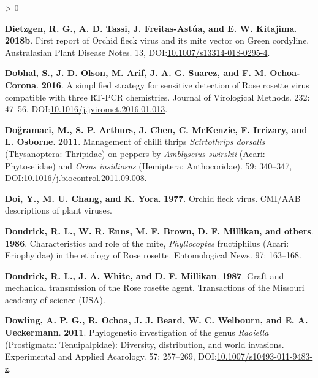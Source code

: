 \documentclass{ufdissertation}[overrideChapters] %
\newlength{\cslhangindent}
\newenvironment{CSLReferences}[2] %
 {%
  \setlength{\parindent}{0pt}
  \ifodd #1 \everypar{\setlength{\hangindent}{\cslhangindent}}\ignorespaces\fi
  \ifnum #2 > 0
  \setlength{\parskip}{#2\baselineskip}
  \fi
 }%
 {}
\begin{document}
{\begin{CSLReferences}{1}{1}
\leavevmode{}%
\textbf{Dietzgen, R. G., A. D. Tassi, J. Freitas-Astúa, and E. W. Kitajima}. \textbf{2018b}. First report of {Orchid fleck virus} and its mite vector on {Green cordyline}. Australasian Plant Disease Notes. 13, DOI:\href{https://doi.org/10.1007/s13314-018-0295-4}{10.1007/s13314-018-0295-4}.

\leavevmode{}%
\textbf{Dobhal, S., J. D. Olson, M. Arif, J. A. G. Suarez, and F. M. Ochoa-Corona}. \textbf{2016}. A simplified strategy for sensitive detection of {Rose rosette virus} compatible with three {RT}-{PCR} chemistries. Journal of Virological Methods. 232: 47--56, DOI:\href{https://doi.org/10.1016/j.jviromet.2016.01.013}{10.1016/j.jviromet.2016.01.013}.

\leavevmode{}%
\textbf{Doğramaci, M., S. P. Arthurs, J. Chen, C. McKenzie, F. Irrizary, and L. Osborne}. \textbf{2011}. Management of chilli thrips {\emph{Scirtothrips dorsalis}} ({Thysanoptera}: {Thripidae}) on peppers by {\emph{Amblyseius swirskii}} ({Acari}: {Phytoseiidae}) and {\emph{Orius insidiosus}} ({Hemiptera}: {Anthocoridae}). 59: 340--347, DOI:\href{https://doi.org/10.1016/j.biocontrol.2011.09.008}{10.1016/j.biocontrol.2011.09.008}.

\leavevmode{}%
\textbf{Doi, Y., M. U. Chang, and K. Yora}. \textbf{1977}. Orchid fleck virus. {CMI/AAB} descriptions of plant viruses.

\leavevmode{}%
\textbf{Doudrick, R. L., W. R. Enns, M. F. Brown, D. F. Millikan, and others}. \textbf{1986}. Characteristics and role of the mite, {\emph{Phyllocoptes} fructiphilus} ({Acari}: {Eriophyidae}) in the etiology of {Rose rosette}. Entomological News. 97: 163--168.

\leavevmode{}%
\textbf{Doudrick, R. L., J. A. White, and D. F. Millikan}. \textbf{1987}. Graft and mechanical transmission of the {Rose rosette} agent. Transactions of the {Missouri} academy of science {(USA)}.

\leavevmode{}%
\textbf{Dowling, A. P. G., R. Ochoa, J. J. Beard, W. C. Welbourn, and E. A. Ueckermann}. \textbf{2011}. Phylogenetic investigation of the genus {\emph{Raoiella}} ({Prostigmata}: {Tenuipalpidae}): Diversity, distribution, and world invasions. Experimental and Applied Acarology. 57: 257--269, DOI:\href{https://doi.org/10.1007/s10493-011-9483-z}{10.1007/s10493-011-9483-z}.


\end{CSLReferences}}
\end{document}
